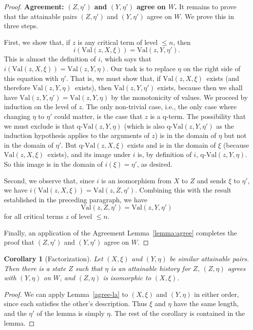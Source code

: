 \documentclass{LMCS}
\newtheorem{coro}[thm]{Corollary}
\theoremstyle{definition}
\newcommand{\qval}[3]{\ensuremath{\text{q-Val}(#1,#2,#3)}}
\newcommand{\val}[3]{\ensuremath{\text{Val}(#1,#2,#3)}}
\begin{document}
\begin{proof}
\medskip\noindent\textbf{Agreement: $(Z,\eta')$ and $(Y,\eta')$ agree
  on $W$.}
It remains to prove that the attainable pairs $(Z,\eta')$ and
$(Y,\eta')$ agree on $W$.  We prove this in three steps.

First, we show that, if $z$ is any critical term of level $\leq
n$, then
$$
i(\val zX\xi)=\val zY{\eta'}.
$$
This is almost the definition of $i$, which says that $i(\val
zX\xi)=\val zY\eta$.  Our task is to replace $\eta$ on the right
side of this equation with $\eta'$.  That is, we must show that,
if \val zX\xi\ exists (and therefore \val zY\eta\ exists), then
\val zY{\eta'} exists, because then we shall have $\val
zY{\eta'}=\val zY\eta$ by the monotonicity of values.  We proceed
by induction on the level of $z$.
The only non-trivial case, i.e., the only case where changing
$\eta$ to $\eta'$ could matter, is the case that $z$ is a q-term.
The possibility that we must exclude is that $\qval zY\eta$ (which
is also \qval zY{\eta'} as the induction hypothesis applies to the
arguments of $z$) is in the domain of $\eta$ but not in the domain
of $\eta'$. But $\qval zX\xi$ exists and is in the domain of $\xi$
(because \val zX\xi\ exists), and its image under $i$ is, by
definition of $i$, \qval zY\eta.  So this image is in the domain
of $i(\xi)=\eta'$, as desired.

Second, we observe that, since $i$ is an isomorphism from $X$ to $Z$
and sends $\xi$ to $\eta'$, we have $i(\val zX\xi)=\val zZ{\eta'}$.
Combining this with the result established in the preceding paragraph,
we have
$$
\val zZ{\eta'}=\val zY{\eta'}
$$
for all critical terms $z$ of level $\leq n$.

Finally, an application of the Agreement Lemma~\ref{lemma:agree}
completes the proof that $(Z,\eta')$ and $(Y,\eta')$ agree on $W$.
\end{proof}

\begin{coro}[Factorization]    \label{agree-cor}
Let $(X,\xi)$ and $(Y,\eta)$ be similar attainable pairs.   Then
there is a state $Z$ such that $\eta$ is an attainable history for
$Z$, $(Z,\eta)$ agrees with $(Y,\eta)$ on $W$, and $(Z,\eta)$ is
isomorphic to $(X,\xi)$.
\end{coro}

\begin{proof}
We can apply Lemma~\ref{agree-la} to $(X,\xi)$ and $(Y,\eta)$ in
either order, since each satisfies the other's description.  Thus
$\xi$ and $\eta$ have the same length, and the $\eta'$ of the lemma is
simply $\eta$.  The rest of the corollary is contained in the lemma.
\end{proof}
\end{document}
